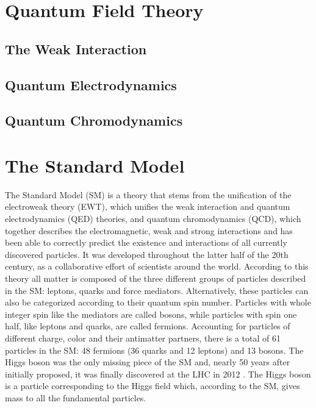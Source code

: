 \section{Quantum Field Theory}
\subsection{The Weak Interaction}
\subsection{Quantum Electrodynamics}
\subsection{Quantum Chromodynamics}

\section{The Standard Model}

The Standard Model (SM)\cite{SM1} is a theory that stems from the unification of the electroweak theory (EWT)\cite{EWT}, which unifies the weak interaction and quantum electrodynamics (QED) theories, and quantum chromodynamics (QCD)\cite{QCD}, which together describes the electromagnetic, weak and strong interactions and has been able to correctly predict the existence and interactions of all currently discovered particles. It was developed throughout the latter half of the 20th century, as a collaborative effort of scientists around the world. According to this theory all matter is composed of the three different groups of particles described in the SM: leptons, quarks and force mediators. Alternatively, these particles can also be categorized according to their quantum spin number. Particles with whole integer spin like the mediators are called bosons, while particles with spin one half, like leptons and quarks, are called fermions. Accounting for particles of different charge, color and their antimatter partners, there is a total of 61 particles in the SM: 48 fermions (36 quarks and 12 leptons) and 13 bosons. The Higgs boson\cite{Higgs1} was the only missing piece of the SM and, nearly 50 years after initially proposed, it was finally discovered at the LHC in 2012 \cite{Higgs,Higgs2}. The Higgs boson is a particle corresponding to the Higgs field which, according to the SM, gives mass to all the fundamental particles.

\begin{comment} %
\begin{figure}[tb]
\begin{center}
\texttt{[image: SM.png]} 
\caption{Schematic representation of the Standard Model particles. Shown are the three generations of matter (formed by fermions), the gauge bosons and the Higgs boson.}
\label{SM.png} 
\end{center}
\end{figure}
\end{comment} %

